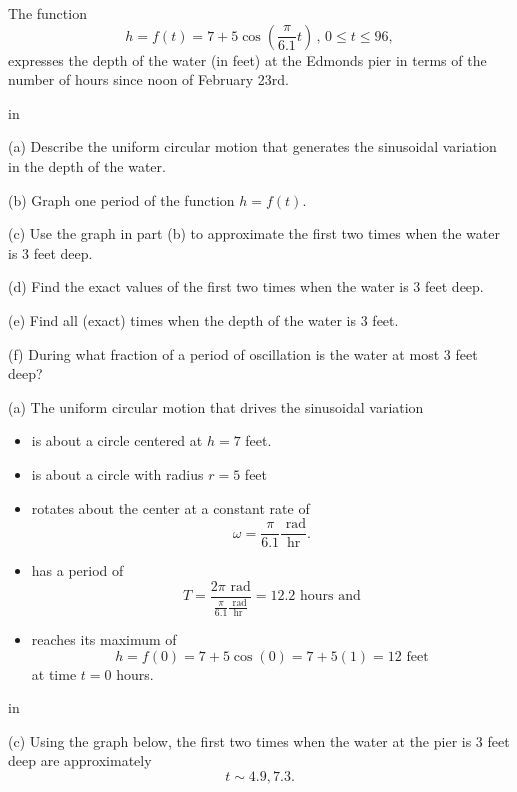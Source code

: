 \documentclass{ximera}
\newcommand{\pskip}{\vskip 0.1 in}
\begin{document}
\begin{example}  \label{Exer67u8gg}
The function
\[
    h  = f(t) = 7 + 5 \cos \left( \frac{\pi}{6.1}t  \right) \, , \, 0\leq t \leq 96 ,
\]
expresses the depth of the water (in feet) at the Edmonds pier in terms of the number of hours since noon of February 23rd.

\pskip

(a) Describe the uniform circular motion that generates the sinusoidal variation in the depth of the water.

(b) Graph one period of the function $h=f(t)$.

(c) Use the graph in part (b) to approximate the first two times when the water is $3$ feet deep. 

(d) Find the exact values of the first two times when the water is $3$ feet deep.

(e) Find all (exact) times when the depth of the water is $3$ feet.

(f) During what fraction of a period of oscillation is the water at most $3$ feet deep?


\begin{explanation}
(a) The uniform circular motion that drives the sinusoidal variation

\begin{itemize}

\item{is about a circle centered at $h=7$ feet.}

\item{is about a circle with radius $r=5$ feet}

\item{rotates about the center at a constant rate of 
\[
     \omega = \frac{\pi}{6.1} \frac{ \text{ rad}}{\text{hr}} .
\]}

\item{has a period of
\[
   T =  \frac{2\pi \text{ rad}}{\frac{\pi}{6.1} \frac{ \text{ rad}}{\text{hr}}} = 12.2 \text{ hours and} 
\]}

\item{reaches its maximum of 
\[
   h  = f(0) = 7 + 5 \cos(0) = 7 + 5(1) = 12 \text{ feet}
\]
at time $t=0$ hours.}

\end{itemize}

\pskip

(c) Using the graph below, the first two times when the water at the pier is $3$ feet deep are approximately
\[
  t \sim 4.9, 7.3 .
\]

\end{explanation}
\end{example}
\end{document}
